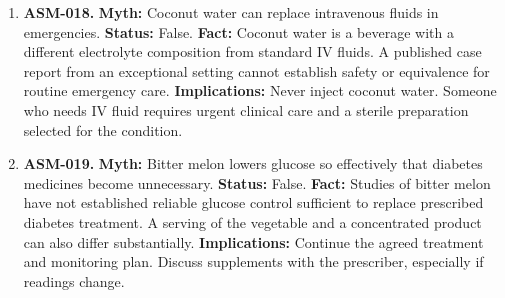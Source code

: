 \documentclass[11pt,oneside]{book}
\begin{document}
\begin{enumerate}[leftmargin=0pt,labelwidth=0pt,labelsep=0pt,itemindent=0pt]
\textbf{Status:} False.\newline
\textbf{Fact:} A laboratory study found that durian extract inhibited an enzyme involved in alcohol metabolism. It did not measure illness or death in people eating durian with alcohol. Human evidence does not establish a routinely lethal interaction. \cite{ref290}\newline
\textbf{Implications:} The finding cannot be used to calculate a safe drinking limit. Heavy alcohol consumption can cause poisoning regardless of the meal.
\item[] \textbf{ASM-018.} \textbf{Myth:} Coconut water can replace intravenous fluids in emergencies.\newline
\textbf{Status:} False.\newline
\textbf{Fact:} Coconut water is a beverage with a different electrolyte composition from standard IV fluids. A published case report from an exceptional setting cannot establish safety or equivalence for routine emergency care. \cite{ref291}\newline
\textbf{Implications:} Never inject coconut water. Someone who needs IV fluid requires urgent clinical care and a sterile preparation selected for the condition.
\item[] \textbf{ASM-019.} \textbf{Myth:} Bitter melon lowers glucose so effectively that diabetes medicines become unnecessary.\newline
\textbf{Status:} False.\newline
\textbf{Fact:} Studies of bitter melon have not established reliable glucose control sufficient to replace prescribed diabetes treatment. A serving of the vegetable and a concentrated product can also differ substantially. \cite{ref81}\newline
\textbf{Implications:} Continue the agreed treatment and monitoring plan. Discuss supplements with the prescriber, especially if readings change.
\end{enumerate}
\end{document}
